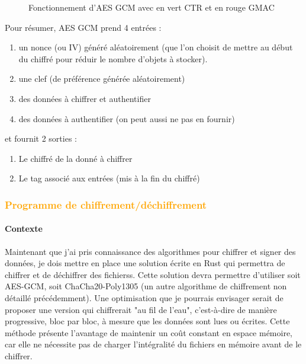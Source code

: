 \documentclass[a4paper, 12pt]{article}
\begin{document}
\begin{figure}[h]
\caption{Fonctionnement d'AES GCM avec en vert CTR et en rouge GMAC}
\label{aesgcm}
\end{figure}


\noindent Pour résumer, AES GCM prend 4 entrées : 
\begin{enumerate}
	\item un nonce (ou IV) généré aléatoirement (que l'on choisit de mettre au début du chiffré pour réduir le nombre d'objets à stocker).
	\item une clef (de préférence générée aléatoirement)
	\item des données à chiffrer et authentifier 
	\item des données à authentifier (on peut aussi ne pas en fournir)
\end{enumerate}
\noindent et fournit 2 sorties :
\begin{enumerate}
	\item Le chiffré de la donné à chiffrer
\item Le tag associé aux entrées (mis à la fin du chiffré)
\end{enumerate}

\subsubsection{\textcolor{orange}{Programme de chiffrement/déchiffrement}}
\paragraph{Contexte}
Maintenant que j'ai pris connaissance des algorithmes pour chiffrer et signer des données, je dois mettre en place une solution écrite en Rust qui permettra de chiffrer et de déchiffrer des fichierss. Cette solution devra permettre d'utiliser soit AES-GCM, soit ChaCha20-Poly1305 (un autre algorithme de chiffrement non détaillé précédemment).
Une optimisation que je pourrais envisager serait de proposer une version qui chiffrerait "au fil de l'eau", c'est-à-dire de manière progressive, bloc par bloc, à mesure que les données sont lues ou écrites. Cette méthode présente l'avantage de maintenir un coût constant en espace mémoire, car elle ne nécessite pas de charger l'intégralité du fichiers en mémoire avant de le chiffrer. \\
\end{document}
